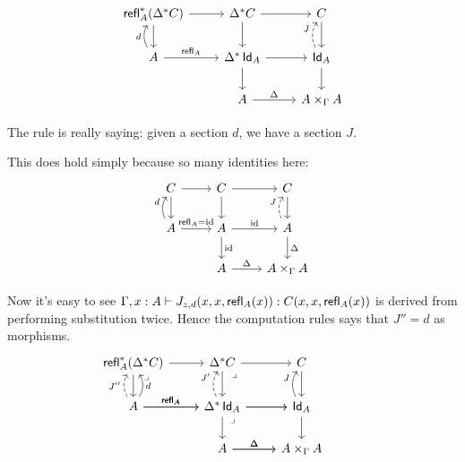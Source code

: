\[\begin{tikzcd}
	{\refl_A^*(\Delta^*C)} & {\Delta^*C} & C \\
	A & {\Delta^*\Id_A} & {\Id_A} \\
	& A & {A\times_\Gamma A}
	\arrow[from=1-1, to=1-2]
	\arrow[from=1-1, to=2-1]
	\arrow[from=1-2, to=1-3]
	\arrow[from=1-2, to=2-2]
	\arrow[from=1-3, to=2-3]
	\arrow["{d}", bend left, from=2-1, to=1-1]
	\arrow["{\refl_A}", from=2-1, to=2-2]
	\arrow[from=2-2, to=2-3]
	\arrow[from=2-2, to=3-2]
	\arrow["J", bend left, dashed, from=2-3, to=1-3]
	\arrow[from=2-3, to=3-3]
	\arrow["\Delta", from=3-2, to=3-3]
\end{tikzcd}\]

The rule is really saying: given a section $d$, we have a section $J$.

This does hold simply because so many identities here:
\[\begin{tikzcd}
	C & C & C \\
	A & A & A \\
	& A & {A\times_\Gamma A}
	\arrow[from=1-1, to=1-2]
	\arrow[from=1-1, to=2-1]
	\arrow[from=1-2, to=1-3]
	\arrow[from=1-2, to=2-2]
	\arrow[from=1-3, to=2-3]
	\arrow["{{d}}", bend left, from=2-1, to=1-1]
	\arrow["{{\refl_A}=\id}", from=2-1, to=2-2]
	\arrow["\id", from=2-2, to=2-3]
	\arrow["\id", from=2-2, to=3-2]
	\arrow["J", bend left, dashed, from=2-3, to=1-3]
	\arrow["\Delta", from=2-3, to=3-3]
	\arrow["\Delta", from=3-2, to=3-3]
\end{tikzcd}\]

Now it's easy to see $\Gamma, x : A\vdash J_{z,d}(x,x,\operatorname{\mathsf{refl}}_A(x)) :  C(x,x,\operatorname{\mathsf{refl}}_A(x))$ is derived from performing substitution twice. Hence the computation rules says that $J''=d$ as morphisms.
\[\begin{tikzcd}
	{\refl_A^*(\Delta^*C)} & {\Delta^*C} & C \\
	A & {\Delta^*\Id_A} & {\Id_A} \\
	& A & {A\times_\Gamma A} & {}
	\arrow[from=1-2, to=1-3]
	\arrow[from=1-2, to=2-2]
	\arrow["{\refl_A}", from=2-1, to=2-2]
	\arrow[from=2-2, to=3-2]
	\arrow["\Delta", from=3-2, to=3-3]
	\arrow[from=2-3, to=3-3]
	\arrow[from=2-2, to=2-3]
	\arrow[from=1-3, to=2-3]
	\arrow[from=1-1, to=1-2]
	\arrow[from=1-1, to=2-1]
	\arrow["J''", dashed, bend left, from=2-1, to=1-1]
    \arrow["d"', bend right, from=2-1, to=1-1]
    \arrow["J'", dashed, bend left, from=2-2, to=1-2]
	\arrow["J", bend left, from=2-3, to=1-3]
    \arrow[""{name=0, anchor=center, inner sep=0}, "{{\refl_A}}", from=2-1, to=2-2]
    \arrow[""{name=1, anchor=center, inner sep=0}, from=2-2, to=2-3]
    \arrow[""{name=2, anchor=center, inner sep=0}, "\Delta", from=3-2, to=3-3]
	\arrow["\lrcorner"{anchor=center, pos=0.125}, draw=none, from=1-1, to=0]
	\arrow["\lrcorner"{anchor=center, pos=0.125}, draw=none, from=1-2, to=1]
	\arrow["\lrcorner"{anchor=center, pos=0.125}, draw=none, from=2-2, to=2]
\end{tikzcd}\]